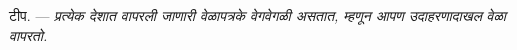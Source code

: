 %
%
%
%
%
%

\VUsaut{4.0mm}
\VUsaut{2.4mm}
\VUsaut{3.4mm}
\textsc{टीप.} --- \textit{प्रत्येक देशात वापरली जाणारी वेळापत्रके वेगवेगळी असतात, म्हणून आपण उदाहरणादाखल}  \textit{वेळा वापरतो.}

